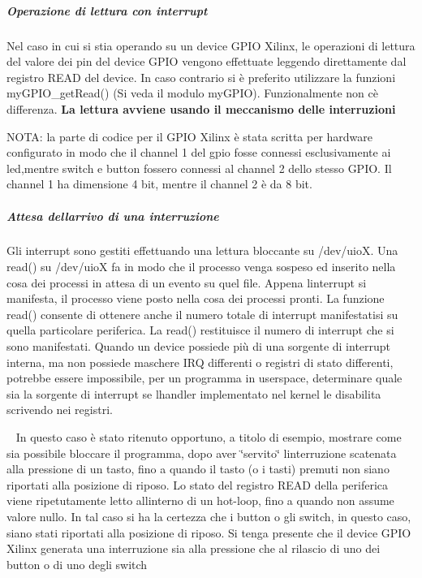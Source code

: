 \subparagraph*{Operazione di lettura con interrupt}

Nel caso in cui si stia operando su un device G\+P\+IO Xilinx, le operazioni di lettura del valore dei pin del device G\+P\+IO vengono effettuate leggendo direttamente dal registro R\+E\+AD del device. In caso contrario si è preferito utilizzare la funzioni my\+G\+P\+I\+O\+\_\+get\+Read() (Si veda il modulo my\+G\+P\+IO). Funzionalmente non c\textquotesingle{}è differenza. {\bfseries La lettura avviene usando il meccanismo delle interruzioni}

N\+O\+TA\+: la parte di codice per il G\+P\+IO Xilinx è stata scritta per hardware configurato in modo che il channel 1 del gpio fosse connessi esclusivamente ai led,mentre switch e button fossero connessi al channel 2 dello stesso G\+P\+IO. Il channel 1 ha dimensione 4 bit, mentre il channel 2 è da 8 bit.

\subparagraph*{Attesa dell\textquotesingle{}arrivo di una interruzione}

Gli interrupt sono gestiti effettuando una lettura bloccante su /dev/uioX. Una read() su /dev/uioX fa in modo che il processo venga sospeso ed inserito nella cosa dei processi in attesa di un evento su quel file. Appena l\textquotesingle{}interrupt si manifesta, il processo viene posto nella cosa dei processi pronti. La funzione read() consente di ottenere anche il numero totale di interrupt manifestatisi su quella particolare periferica. La read() restituisce il numero di interrupt che si sono manifestati. Quando un device possiede più di una sorgente di interrupt interna, ma non possiede maschere I\+RQ differenti o registri di stato differenti, potrebbe essere impossibile, per un programma in userspace, determinare quale sia la sorgente di interrupt se l\textquotesingle{}handler implementato nel kernel le disabilita scrivendo nei registri.

~\newline
 In questo caso è stato ritenuto opportuno, a titolo di esempio, mostrare come sia possibile bloccare il programma, dopo aver \char`\"{}servito\char`\"{} l\textquotesingle{}interruzione scatenata alla pressione di un tasto, fino a quando il tasto (o i tasti) premuti non siano riportati alla posizione di riposo. Lo stato del registro R\+E\+AD della periferica viene ripetutamente letto all\textquotesingle{}interno di un hot-\/loop, fino a quando non assume valore nullo. In tal caso si ha la certezza che i button o gli switch, in questo caso, siano stati riportati alla posizione di riposo. Si tenga presente che il device G\+P\+IO Xilinx generata una interruzione sia alla pressione che al rilascio di uno dei button o di uno degli switch

